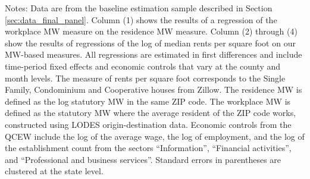 \begin{table}[hbt!]
    \begin{minipage}{.95\textwidth} \footnotesize
        \vspace{2mm}
        Notes:
        Data are from the baseline estimation sample described in Section 
        \ref{sec:data_final_panel}.
        Column (1) shows the results of a regression of the workplace MW measure
        on the residence MW measure.
        Column (2) through (4) show the results of regressions of the log of 
        median rents per square foot on our MW-based measures.
        All regressions are estimated in first differences and include 
        time-period fixed effects and economic controls that vary at the 
        county and month levels.
        The measure of rents per square foot corresponds to the Single Family, 
        Condominium and Cooperative houses from Zillow.
        The residence MW is defined as the log statutory MW in the same ZIP code.
        The workplace MW is defined as the statutory MW where the average 
        resident of the ZIP code works, constructed using LODES 
        origin-destination data.
        Economic controls from the QCEW include the log of the average wage, 
        the log of employment, and the log of the establishment count from the 
        sectors ``Information'', ``Financial activities'', and ``Professional
        and business services''.
        Standard errors in parentheses are clustered at the state level.
    \end{minipage}
\end{table}
